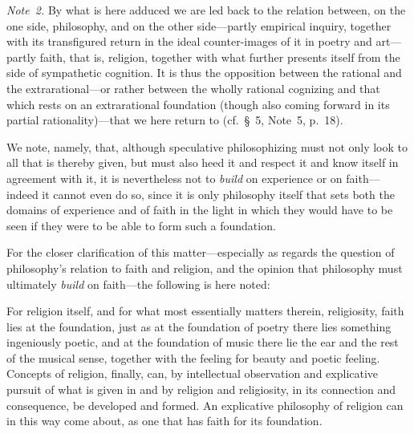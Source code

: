 \documentclass[12pt,a4paper]{book}
\begin{document}
{\small\emph{Note~2.} By what is here adduced we are led back to the relation
between, on the one side, philosophy, and on the other side---partly empirical
inquiry, together with its transfigured return in the ideal counter-images of it in
poetry and art---partly faith, that is, religion, together with what further
presents itself from the side of sympathetic cognition. It is thus the opposition
between the rational and the extrarational---or rather between the wholly rational
cognizing and that which rests on an extrarational foundation (though also coming
forward in its partial rationality)---that we here return to (cf.\ \S~5, Note~5,
p.~18).\par}

We note, namely, that, although speculative philosophizing must not only look to all
that is thereby given, but must also heed it and respect it and know itself in
agreement with it, it is nevertheless not to \emph{build} on experience or on
faith---indeed it cannot even do so, since it is only philosophy itself that sets
both the domains of experience and of faith in the light in which they would have to
be seen if they were to be able to form such a foundation.

For the closer clarification of this matter---especially as regards the question of
philosophy's relation to faith and religion, and the opinion that philosophy must
ultimately \emph{build} on faith---the following is here noted:

For religion itself, and for what most essentially matters therein, religiosity,
faith lies at the foundation, just as at the foundation of poetry there lies
something ingeniously poetic, and at the foundation of music there lie the ear and
the rest of the musical sense, together with the feeling for beauty and poetic
feeling. Concepts of religion, finally, can, by intellectual observation and
explicative pursuit of what is given in and by religion and religiosity, in its
connection and consequence, be developed and formed. An explicative philosophy of
religion can in this way come about, as one that has faith for its foundation.
\end{document}
